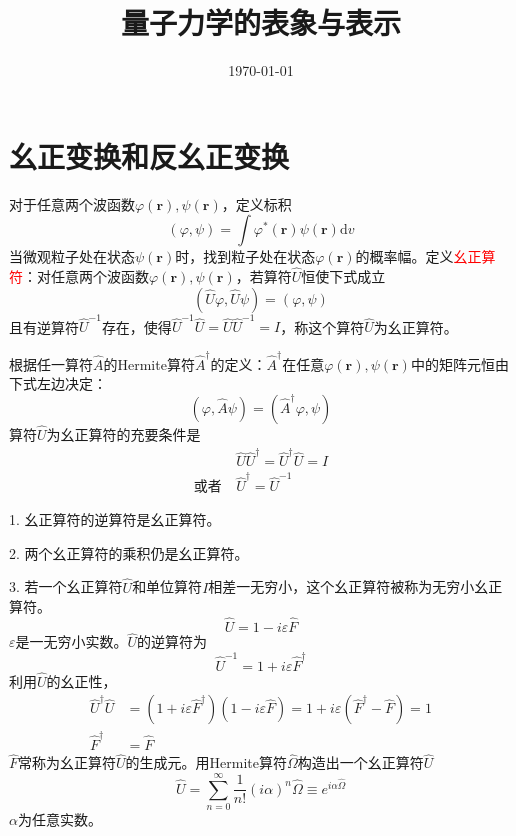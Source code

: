 \documentclass[11pt,a4paper]{article}
\title{量子力学的表象与表示}
\author{}
\date{\today}
\renewcommand{\vec}[1]{\boldsymbol{#1}}
\newcommand{\dif}{\mathrm{d}}
\begin{document}
\maketitle

\section{幺正变换和反幺正变换}
对于任意两个波函数$\varphi(\vec{r}), \psi(\vec{r})$，定义标积
\begin{equation}
(\varphi, \psi) = \int \varphi^\ast(\vec{r}) \psi(\vec{r}) \dif v
\end{equation}
当微观粒子处在状态$\psi(\vec{r})$时，找到粒子处在状态$\varphi(\vec{r})$的概率幅。定义\textcolor{red}{幺正算符}：对任意两个波函数$\varphi(\vec{r}), \psi(\vec{r})$，若算符$\widehat{U}$恒使下式成立
\begin{equation}
(\widehat{U}\varphi, \widehat{U}\psi) = (\varphi, \psi)
\end{equation}
且有逆算符$\widehat{U}^{-1}$存在，使得$\widehat{U}^{-1} \widehat{U} = \widehat{U} \widehat{U}^{-1} = I$，称这个算符$\widehat{U}$为幺正算符。

根据任一算符$\widehat{A}$的Hermite算符$\widehat{A}^\dagger$的定义：$\widehat{A}^\dagger$在任意$\varphi(\vec{r}), \psi(\vec{r})$中的矩阵元恒由下式左边决定：
\begin{equation}
(\varphi, \widehat{A} \psi) = (\widehat{A}^\dagger \varphi, \psi) 
\end{equation}
算符$\widehat{U}$为幺正算符的充要条件是
\begin{align}
& \widehat{U} \widehat{U}^\dagger = \widehat{U}^\dagger \widehat{U} = I \\
\text{或者}~ & \widehat{U}^\dagger = \widehat{U}^{-1}
\end{align}

1. 幺正算符的逆算符是幺正算符。



2. 两个幺正算符的乘积仍是幺正算符。

3. 若一个幺正算符$\widehat{U}$和单位算符$I$相差一无穷小，这个幺正算符被称为无穷小幺正算符。
\begin{equation}
\widehat{U} = 1 - i \varepsilon \widehat{F}
\end{equation}
$\varepsilon$是一无穷小实数。$\widehat{U}$的逆算符为
\begin{equation}
\widehat{U}^{-1} = 1+i \varepsilon \widehat{F}^\dagger
\end{equation}
利用$\widehat{U}$的幺正性，
\begin{align*}
\widehat{U}^\dagger \widehat{U} &= (1+i \varepsilon \widehat{F}^\dagger) (1 - i \varepsilon \widehat{F}) = 1+i \varepsilon(\widehat{F}^\dagger - \widehat{F}) = 1 \\
\widehat{F}^\dagger &= \widehat{F}
\end{align*}
$ \widehat{F}$常称为幺正算符$\widehat{U}$的生成元。用Hermite算符$\widehat{\Omega}$构造出一个幺正算符$\widehat{U}$
\begin{equation}
\widehat{U} = \sum_{n=0}^\infty \dfrac{1}{n!} (i\alpha)^n \widehat{\Omega} \equiv e^{i \alpha \widehat{\Omega}}
\end{equation}
$\alpha$为任意实数。
\end{document}
